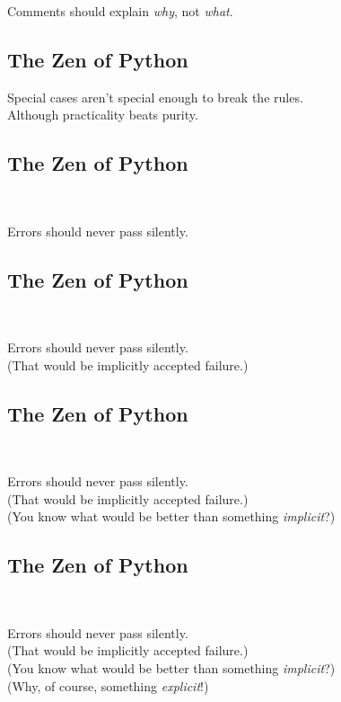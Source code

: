 \documentclass[xga]{xdvislides}
\begin{document}
Comments should explain {\em why}, not {\em what}. \\

\subsection{The Zen of Python}
\begin{center}
    Special cases aren't special enough to break the rules. \\
\addvspace{.5in}
    Although practicality beats purity.
\end{center}

\subsection{The Zen of Python}
\\
\begin{center}
    Errors should never pass silently.
\end{center}

\subsection{The Zen of Python}
\\
\begin{center}
    Errors should never pass silently. \\
\addvspace{.2in}
	\small
	(That would be implicitly accepted failure.)
\end{center}
\Huge

\subsection{The Zen of Python}
\\
\begin{center}
    Errors should never pass silently. \\
\addvspace{.2in}
	\small
	(That would be implicitly accepted failure.) \\
\addvspace{.2in}
	(You know what would be better than something {\em implicit}?)
\end{center}

\subsection{The Zen of Python}
\\
\begin{center}
    Errors should never pass silently. \\
\addvspace{.2in}
	\small
	(That would be implicitly accepted failure.) \\
\addvspace{.2in}
	(You know what would be better than something {\em implicit}?) \\
\addvspace{.2in}
	(Why, of course, something {\em explicit}!)
\end{center}
\end{document}
